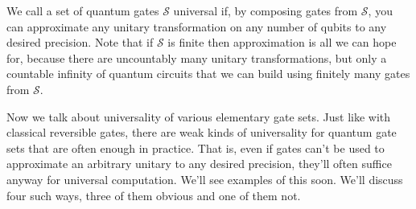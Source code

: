 We call a set of quantum gates $\mathcal{S}$ universal if, by composing gates from $\mathcal{S}$, you can approximate any unitary transformation on any number of qubits to any desired precision. Note that if $\mathcal{S}$ is finite then approximation is all we can hope for, because there are uncountably many unitary transformations, but only a countable infinity of quantum circuits that we can build using finitely many gates from $\mathcal{S}$. 

Now we talk about universality of various elementary gate sets. Just like with classical reversible gates, there are weak kinds of universality for quantum gate sets that are often enough in practice. That is, even if gates can't be used to approximate an arbitrary unitary to any desired precision, they'll often suffice anyway for universal computation. We'll see examples of this soon. We'll discuss four such ways, three of them obvious and one of them not.

